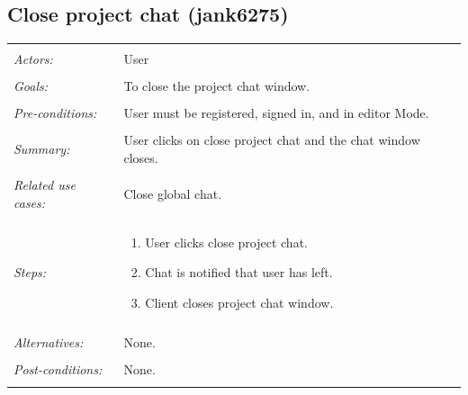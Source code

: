 \documentclass[11pt]{report}
\begin{document}
\begin{IDE-like Features}
\begin{}
\begin{Collaborative features that would be "nice":}
\subsection{Close project chat (jank6275)}
\begin{tabular}{ p{2cm} p{12cm} }
 \hline
 \\
 \textit{Actors:} & User \\ 
 \\
 \textit{Goals:} & To close the project chat window. \\
 \\
 \textit{Pre-conditions:} & User must be registered, signed in, and in editor Mode.  \\
 \\
 \textit{Summary:} & User clicks on close project chat and the chat window closes. \\ 
 \\
 \textit{Related use cases:} & Close global chat. \\ 
 \\
 \textit{Steps:} & \begin{enumerate}
  \item User clicks close project chat.
  \item Chat is notified that user has left.
  \item Client closes project chat window.
 \end{enumerate} \\
 \\
 \textit{Alternatives:} & None. \\
 \\
 \textit{Post-conditions:} & None. \\
 \\
\hline
\end{tabular}


\end{Collaborative features that would be "nice":}
\end{}
\end{IDE-like Features}
\end{document}
